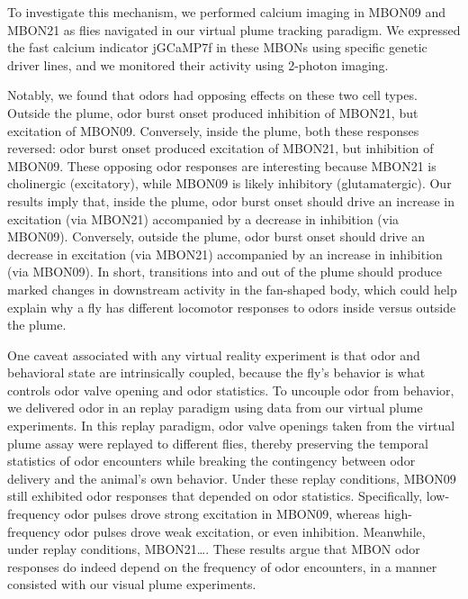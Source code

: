To investigate this mechanism, we performed calcium imaging in MBON09 and MBON21 as flies navigated in our virtual plume tracking paradigm. We expressed the fast calcium indicator jGCaMP7f in these MBONs using specific genetic driver lines,  and we monitored their activity using 2-photon imaging. 

Notably, we found that odors had opposing effects on these two cell types. Outside the plume, odor burst onset produced inhibition of MBON21, but excitation of MBON09. Conversely, inside the plume, both these responses reversed: odor burst onset produced excitation of MBON21, but inhibition of MBON09. These opposing odor responses are interesting because MBON21 is cholinergic (excitatory), while MBON09 is likely inhibitory (glutamatergic). Our results imply that, inside the plume, odor burst onset should drive an increase in excitation (via MBON21) accompanied by a decrease in inhibition (via MBON09). Conversely, outside the plume, odor burst onset should drive an decrease in excitation (via MBON21) accompanied by an increase in inhibition (via MBON09). In short, transitions into and out of the plume should produce marked changes in downstream activity in the fan-shaped body, which could help explain why a fly has different locomotor responses to odors inside versus outside the plume. 

One caveat associated with any virtual reality experiment is that odor and behavioral state are intrinsically coupled, because the fly’s behavior is what controls odor valve opening and odor statistics. To uncouple odor from behavior, we delivered odor in an replay paradigm using data from our virtual plume experiments. In this replay paradigm, odor valve openings taken from the virtual plume assay were replayed to different flies, thereby preserving the temporal statistics of odor encounters while breaking the contingency between odor delivery and the animal’s own behavior. Under these replay conditions, MBON09 still exhibited odor responses that depended on odor statistics. Specifically, low-frequency odor pulses drove strong excitation in MBON09, whereas high-frequency odor pulses drove weak excitation, or even inhibition. Meanwhile, under replay conditions, MBON21…. These results argue that MBON odor responses do indeed depend on the frequency of odor encounters, in a manner consisted with our visual plume experiments. 

